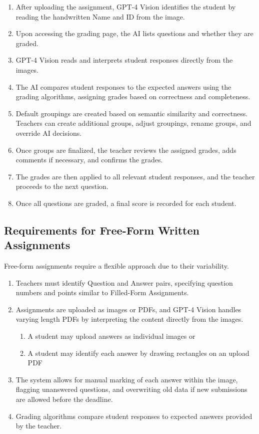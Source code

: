 \documentclass[ms,twoside,print]{nuthesis}
\begin{document}
\begin{enumerate}
    \item After uploading the assignment, GPT-4 Vision identifies the student by reading the handwritten Name and ID from the image.
    \item Upon accessing the grading page, the AI lists questions and whether they are graded.
    \item GPT-4 Vision reads and interprets student responses directly from the images.
    \item The AI compares student responses to the expected answers using the grading algorithms, assigning grades based on correctness and completeness.
    \item Default groupings are created based on semantic similarity and correctness. Teachers can create additional groups, adjust groupings, rename groups, and override AI decisions.
    \item Once groups are finalized, the teacher reviews the assigned grades, adds comments if necessary, and confirms the grades.
    \item The grades are then applied to all relevant student responses, and the teacher proceeds to the next question.
    \item Once all questions are graded, a final score is recorded for each student.
\end{enumerate}

\subsection{Requirements for Free-Form Written Assignments}

Free-form assignments require a flexible approach due to their variability.

\begin{enumerate}
    \item Teachers must identify Question and Answer pairs, specifying question numbers and points similar to Filled-Form Assignments.
    \item Assignments are uploaded as images or PDFs, and GPT-4 Vision handles varying length PDFs by interpreting the content directly from the images. 
    \begin{enumerate}
        \item A student may upload answers as individual images or
        \item A student may identify each answer by drawing rectangles on an upload PDF
    \end{enumerate}
    \item The system allows for manual marking of each answer within the image, flagging unanswered questions, and overwriting old data if new submissions are allowed before the deadline.
    \item Grading algorithms compare student responses to expected answers provided by the teacher.
\end{enumerate}
\end{document}
